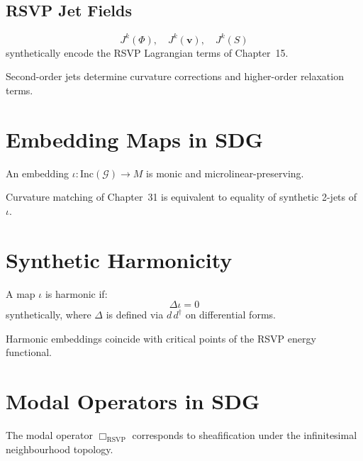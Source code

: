 \subsection{RSVP Jet Fields}

\[
J^k(\Phi),\quad J^k(\mathbf{v}), \quad J^k(S)
\]
synthetically encode the RSVP Lagrangian terms of Chapter~15.

\begin{proposition}
Second-order jets determine curvature corrections and higher-order relaxation terms.
\end{proposition}

\section{Embedding Maps in SDG}

\begin{definition}
An embedding $\iota : \mathrm{Inc}(\mathcal{G}) \to M$ is monic and microlinear-preserving.
\end{definition}

\begin{proposition}
Curvature matching of Chapter~31 is equivalent to equality of synthetic 2-jets of $\iota$.
\end{proposition}

\section{Synthetic Harmonicity}

\begin{definition}
A map $\iota$ is harmonic if:
\[
\Delta \iota = 0
\]
synthetically, where $\Delta$ is defined via $d\,d^\dagger$ on differential forms.
\end{definition}

\begin{proposition}
Harmonic embeddings coincide with critical points of the RSVP energy functional.
\end{proposition}

\section{Modal Operators in SDG}

\begin{proposition}
The modal operator $\Box_{\mathrm{RSVP}}$ corresponds to sheafification under the infinitesimal neighbourhood topology.
\end{proposition}

